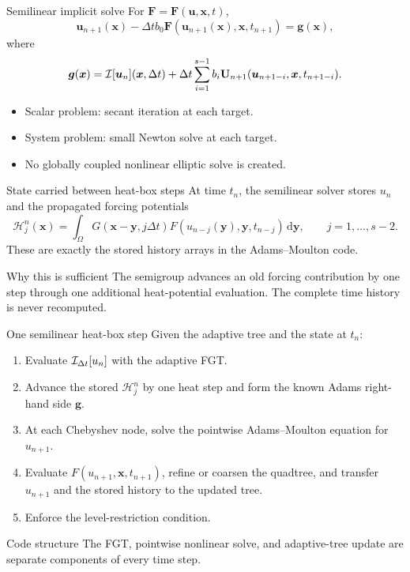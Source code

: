 \documentclass[aspectratio=169,10pt]{beamer}
\newcommand{\dd}{\,\mathrm d}
\newcommand{\x}{\bm{x}}
\newcommand{\y}{\bm{y}}
\newcommand{\uvec}{\bm{u}}
\newcommand{\dt}{\Delta t}
\begin{document}
\begin{frame}{Semilinear implicit solve}
\small
For $\bm{F}=\bm{F}(\uvec,\x,t)$,
\[
  \uvec_{n+1}(\x)-\dt b_0
  \bm{F}(\uvec_{n+1}(\x),\x,t_{n+1})
  =\bm{g}(\x),
\]
where
\[
  \bm{g}(\x)=\Iop[\uvec_n](\x,\dt)
  +\dt\sum_{i=1}^{s-1}b_i
  \mathbf{U}_{n+1}(\uvec_{n+1-i},\x,t_{n+1-i}).
\]

\begin{itemize}
  \item Scalar problem: secant iteration at each target.
  \item System problem: small Newton solve at each target.
  \item No globally coupled nonlinear elliptic solve is created.
\end{itemize}
\end{frame}

\begin{frame}{State carried between heat-box steps}
\small
At time $t_n$, the semilinear solver stores $u_n$ and the propagated forcing
potentials
\[
  \mathcal H_j^n(\x)=
  \int_\Omega G(\x-\y,j\dt)
  F(u_{n-j}(\y),\y,t_{n-j})\dd\y,
  \qquad j=1,\ldots,s-2.
\]
These are exactly the stored history arrays in the Adams--Moulton code.

\begin{block}{Why this is sufficient}
The semigroup advances an old forcing contribution by one step through one
additional heat-potential evaluation. The complete time history is never
recomputed.
\end{block}
\end{frame}

\begin{frame}{One semilinear heat-box step}
\small
Given the adaptive tree and the state at $t_n$:
\begin{enumerate}
  \item Evaluate $\Iop_{\dt}[u_n]$ with the adaptive FGT.
  \item Advance the stored $\mathcal H_j^n$ by one heat step and form the
  known Adams right-hand side $\bm g$.
  \item At each Chebyshev node, solve the pointwise Adams--Moulton equation
  for $u_{n+1}$.
  \item Evaluate $F(u_{n+1},\x,t_{n+1})$, refine or coarsen the quadtree, and
  transfer $u_{n+1}$ and the stored history to the updated tree.
  \item Enforce the level-restriction condition.
\end{enumerate}

\begin{block}{Code structure}
The FGT, pointwise nonlinear solve, and adaptive-tree update are separate
components of every time step.
\end{block}
\end{frame}
\end{document}
